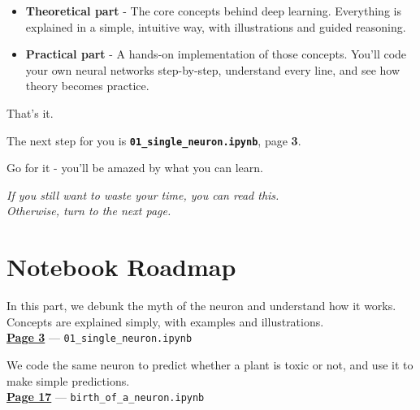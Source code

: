 \documentclass[11pt]{article}
\begin{document}
\begin{itemize}
    \item \textbf{Theoretical part} - The core concepts behind deep learning. Everything is explained in a simple, intuitive way, with illustrations and guided reasoning.
    \item \textbf{Practical part} - A hands-on implementation of those concepts. You'll code your own neural networks step-by-step, understand every line, and see how theory becomes practice.
\end{itemize}

\vspace{1em}

\noindent
That's it.

\vspace{0.8em}

\noindent
The next step for you is \textbf{\texttt{01\_single\_neuron.ipynb}}, page \textbf{3}.

\vspace{0.5em}

\noindent
Go for it - you'll be amazed by what you can learn.

\newpage
\begin{center}
\itshape
If you still want to waste your time, you can read this.\\
Otherwise, turn to the next page.
\end{center}

\vspace{1em}

\section*{Notebook Roadmap}

\begin{tcolorbox}[colback=gray!5, colframe=gray!60!black, title=Understanding the neuron, fonttitle=\bfseries]
In this part, we debunk the myth of the neuron and understand how it works. Concepts are explained simply, with examples and illustrations.\\
\hyperref[sec:theory_00]{\textbf{Page 3}} — \texttt{01\_single\_neuron.ipynb}
\end{tcolorbox}

\vspace{0.7em}

\begin{tcolorbox}[colback=gray!5, colframe=gray!60!black, title=Can it predict a toxic/non-toxic plant?, fonttitle=\bfseries]
We code the same neuron to predict whether a plant is toxic or not, and use it to make simple predictions.\\
\hyperref[sec:practice_00]{\textbf{Page 17}} — \texttt{birth\_of\_a\_neuron.ipynb}
\end{tcolorbox}
\end{document}
